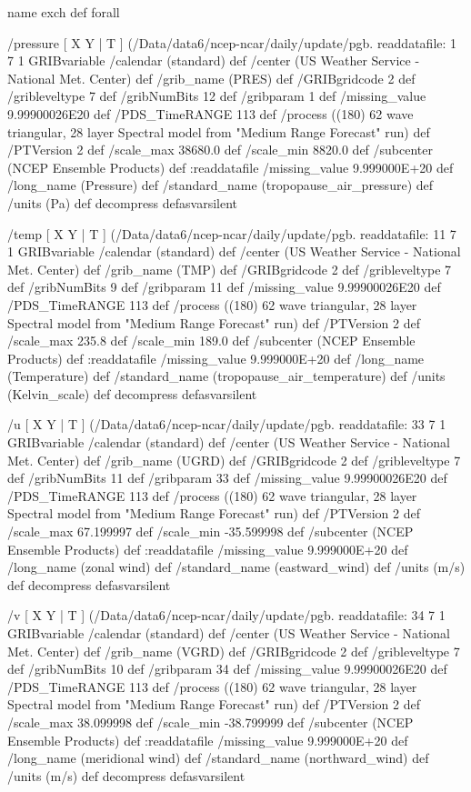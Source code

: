 \begin{ingrid}
   { name exch def } forall

  /pressure { [ X Y | T ] (/Data/data6/ncep-ncar/daily/update/pgb.%
  readdatafile:
  1 7 1 GRIBvariable
  /calendar (standard) def
  /center (US Weather Service - National Met. Center) def
  /grib_name (PRES) def
  /GRIBgridcode 2 def
  /gribleveltype 7 def
  /gribNumBits 12 def
  /gribparam 1 def
  /missing_value 9.99900026E20 def
  /PDS_TimeRANGE 113 def
  /process ((180) 62 wave triangular, 28 layer Spectral model from "Medium Range Forecast" run) def
  /PTVersion 2 def
  /scale_max 38680.0 def
  /scale_min 8820.0 def
  /subcenter (NCEP Ensemble Products) def
  :readdatafile
  /missing_value 9.999000E+20 def
  /long_name (Pressure) def
  /standard_name (tropopause_air_pressure) def
  /units (Pa) def
  decompress
  } defasvarsilent

  /temp { [ X Y | T ] (/Data/data6/ncep-ncar/daily/update/pgb.%
  readdatafile:
  11 7 1 GRIBvariable
  /calendar (standard) def
  /center (US Weather Service - National Met. Center) def
  /grib_name (TMP) def
  /GRIBgridcode 2 def
  /gribleveltype 7 def
  /gribNumBits 9 def
  /gribparam 11 def
  /missing_value 9.99900026E20 def
  /PDS_TimeRANGE 113 def
  /process ((180) 62 wave triangular, 28 layer Spectral model from "Medium Range Forecast" run) def
  /PTVersion 2 def
  /scale_max 235.8 def
  /scale_min 189.0 def
  /subcenter (NCEP Ensemble Products) def
  :readdatafile
  /missing_value 9.999000E+20 def
  /long_name (Temperature) def
  /standard_name (tropopause_air_temperature) def
  /units (Kelvin_scale) def
  decompress
  } defasvarsilent

  /u { [ X Y | T ] (/Data/data6/ncep-ncar/daily/update/pgb.%
  readdatafile:
  33 7 1 GRIBvariable
  /calendar (standard) def
  /center (US Weather Service - National Met. Center) def
  /grib_name (UGRD) def
  /GRIBgridcode 2 def
  /gribleveltype 7 def
  /gribNumBits 11 def
  /gribparam 33 def
  /missing_value 9.99900026E20 def
  /PDS_TimeRANGE 113 def
  /process ((180) 62 wave triangular, 28 layer Spectral model from "Medium Range Forecast" run) def
  /PTVersion 2 def
  /scale_max 67.199997 def
  /scale_min -35.599998 def
  /subcenter (NCEP Ensemble Products) def
  :readdatafile
  /missing_value 9.999000E+20 def
  /long_name (zonal wind) def
  /standard_name (eastward_wind) def
  /units (m/s) def
  decompress
  } defasvarsilent

  /v { [ X Y | T ] (/Data/data6/ncep-ncar/daily/update/pgb.%
  readdatafile:
  34 7 1 GRIBvariable
  /calendar (standard) def
  /center (US Weather Service - National Met. Center) def
  /grib_name (VGRD) def
  /GRIBgridcode 2 def
  /gribleveltype 7 def
  /gribNumBits 10 def
  /gribparam 34 def
  /missing_value 9.99900026E20 def
  /PDS_TimeRANGE 113 def
  /process ((180) 62 wave triangular, 28 layer Spectral model from "Medium Range Forecast" run) def
  /PTVersion 2 def
  /scale_max 38.099998 def
  /scale_min -38.799999 def
  /subcenter (NCEP Ensemble Products) def
  :readdatafile
  /missing_value 9.999000E+20 def
  /long_name (meridional wind) def
  /standard_name (northward_wind) def
  /units (m/s) def
  decompress
  } defasvarsilent


\end{ingrid}
